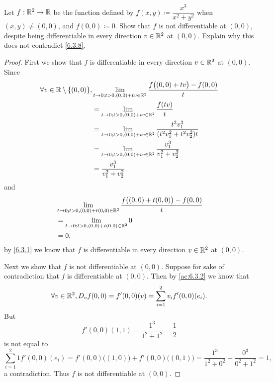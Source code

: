 \begin{ex}\label{ex:6.3.3}
  Let \(f : \mathbb{R}^2 \to \mathbb{R}\) be the function defined by \(f(x, y) \coloneqq \dfrac{x^3}{x^2 + y^2}\) when \((x, y) \neq (0, 0)\), and \(f(0, 0) \coloneqq 0\).
  Show that \(f\) is not differentiable at \((0, 0)\), despite being differentiable in every direction \(v \in \mathbb{R}^2\) at \((0, 0)\).
  Explain why this does not contradict \cref{6.3.8}.
\end{ex}

\begin{proof}
  First we show that \(f\) is differentiable in every direction \(v \in \mathbb{R}^2\) at \((0, 0)\).
  Since
  \begin{align*}
    \forall v \in \mathbb{R} \setminus \{(0, 0)\}, & \lim_{t \to 0 ; t > 0, (0, 0) + tv \in \mathbb{R}^2} \dfrac{f\big((0, 0) + tv\big) - f(0, 0)}{t}    \\
                                           & = \lim_{t \to 0 ; t > 0, (0, 0) + tv \in \mathbb{R}^2} \dfrac{f(tv)}{t}                             \\
                                           & = \lim_{t \to 0 ; t > 0, (0, 0) + tv \in \mathbb{R}^2} \dfrac{t^3 v_1^3}{(t^2 v_1^2 + t^2 v_2^2) t} \\
                                           & = \lim_{t \to 0 ; t > 0, (0, 0) + tv \in \mathbb{R}^2} \dfrac{v_1^3}{v_1^2 + v_2^2}                 \\
                                           & = \dfrac{v_1^3}{v_1^2 + v_2^2}
  \end{align*}
  and
  \begin{align*}
     & \lim_{t \to 0 ; t > 0, (0, 0) + t (0, 0) \in \mathbb{R}^2} \dfrac{f\big((0, 0) + t(0, 0)\big) - f(0, 0)}{t} \\
     & = \lim_{t \to 0 ; t > 0, (0, 0) + t (0, 0) \in \mathbb{R}^2} 0                                              \\
     & = 0,
  \end{align*}
  by \cref{6.3.1} we know that \(f\) is differentiable in every direction \(v \in \mathbb{R}^2\) at \((0, 0)\).

  Next we show that \(f\) is not differentiable at \((0, 0)\).
  Suppose for sake of contradiction that \(f\) is differentiable at \((0, 0)\).
  Then by \cref{ac:6.3.2} we know that
  \[
    \forall v \in \mathbb{R}^2, D_v f(0, 0) = f'(0, 0)(v) = \sum_{i = 1}^2 v_i f'(0, 0)(e_i).
  \]
  But
  \[
    f'(0, 0)(1, 1) = \dfrac{1^3}{1^2 + 1^2} = \dfrac{1}{2}
  \]
  is not equal to
  \[
    \sum_{i = 1}^2 1 f'(0, 0)(e_i) = f'(0, 0)\big((1, 0)\big) + f'(0, 0)\big((0, 1)\big) = \dfrac{1^3}{1^2 + 0^2} + \dfrac{0^3}{0^2 + 1^2} = 1,
  \]
  a contradiction.
  Thus \(f\) is not differentiable at \((0, 0)\).


\end{proof}
